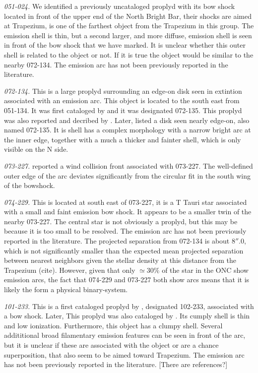 \documentclass[iop, apj]{emulateapj}
\begin{document}
\textit{051-024.} We identified a previously uncataloged proplyd with its bow shock located in front of the upper end of the North Bright Bar, their shocks are aimed at Trapezium, is one of the farthest object from the Trapezium in this group. The emission shell is thin, but a second larger, and more diffuse, emission shell is seen in front of the bow shock that we have marked. It is unclear whether this outer shell is related to the object or not. If it is true the object would be similar to the nearby 072-134. The emission arc has not been previously reported in the literature. 

\textit{072-134.} This is a large proplyd surrounding an edge-on disk seen in extintion associated with an emission arc. This object is located to the south east from 051-134. It was first cataloged by \citet{ODell:1996a} and it was designated 072-135. This proplyd was also reported and decribed by \citet{Bally:2000a}. Later, \citet{Ricci:2008a} listed a disk seen nearly edge-on, also named 072-135. It is shell has a complex morphology with a narrow bright arc at the inner edge, together with a much a thicker and fainter shell, which is only visible on the N side.         

\textit{073-227.} \citet{Bally:2000a} reported a wind collision front associated with 073-227. The well-defined outer edge of the arc deviates significantly from the circular fit in the south wing of the bowshock.
   
\textit{074-229.} This is located at south east of 073-227, it is a T Tauri star associated with a small and faint emission bow shock. It appears to be a smaller twin of the nearby 073-227. The central star is not obviously a proplyd, but this may be because it is too small to be resolved. The emission arc has not been previously reported in the literature. The projected separation from 072-134 is about \(8''.0\), which is not significantly smaller than the expected mean projected separation between nearest neighbors given the stellar density at this distance from the Trapezium (cite). However, given that only \(\simeq30\%\) of the star in the ONC show emission arcs, the fact that 074-229 and 073-227 both show arcs means that it is likely the form a  physical binary-system.
 
\textit{101-233.} This is a first cataloged proplyd by \citet{ODell:1996a}, designated 102-233, associated with a bow shock. Later, This proplyd was also cataloged by \citet{Ricci:2008a}. Its cumply shell is thin and low ionization. Furthermore, this object has a clumpy shell. Several addititional broad filamentary emission features can be seen in front of the arc, but it is unclear if these are associated with the object or are a chance superposition, that also seem to be aimed toward Trapezium. The emission arc has not been previously reported in the literature. [There are references?]   
\end{document}
